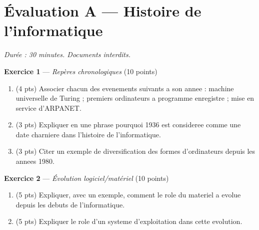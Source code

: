 \section*{Évaluation A --- Histoire de l'informatique}
\textit{Durée : 30 minutes. Documents interdits.}


\bigskip

\textbf{Exercice 1} --- \textit{Repères chronologiques} \hfill (10 points)

\begin{enumerate}
  \item (4 pts) Associer chacun des evenements suivants a son annee : machine universelle de Turing ; premiers ordinateurs a programme enregistre ; mise en service d'ARPANET.
  \item (3 pts) Expliquer en une phrase pourquoi 1936 est consideree comme une date charniere dans l'histoire de l'informatique.
  \item (3 pts) Citer un exemple de diversification des formes d'ordinateurs depuis les annees 1980.
\end{enumerate}


\bigskip

\textbf{Exercice 2} --- \textit{Évolution logiciel/matériel} \hfill (10 points)

\begin{enumerate}
  \item (5 pts) Expliquer, avec un exemple, comment le role du materiel a evolue depuis les debuts de l'informatique.
  \item (5 pts) Expliquer le role d'un systeme d'exploitation dans cette evolution.
\end{enumerate}
